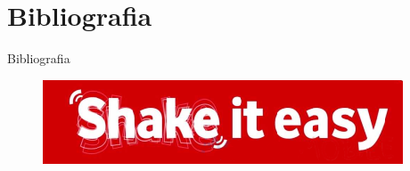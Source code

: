 \documentclass{beamer}
\begin{document}
\section{Bibliografia}
\begin{frame}{Bibliografia}
\printbibliography
\end{frame}

\begin{frame}
\begin{figure}[H]
\includegraphics[width=\textwidth]{../figure/vodafone.png}
\end{figure}
\end{frame}
\end{document}
